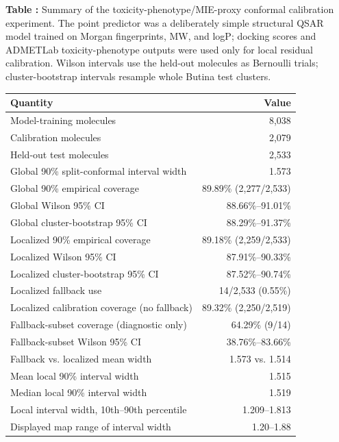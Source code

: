 \begin{center}
\label{tab:local_conformal}
\begin{minipage}{0.92\textwidth}
\textbf{Table \thetable:} Summary of the toxicity-phenotype/MIE-proxy conformal calibration experiment. The point predictor was a deliberately simple structural QSAR model trained on Morgan fingerprints, MW, and logP; docking scores and ADMETLab toxicity-phenotype outputs were used only for local residual calibration. Wilson intervals use the held-out molecules as Bernoulli trials; cluster-bootstrap intervals resample whole Butina test clusters.
\par\vspace{0.5em}
\centering
\begin{tabular}{lr}
\toprule
Quantity & Value \\
\midrule
Model-training molecules & 8,038 \\
Calibration molecules & 2,079 \\
Held-out test molecules & 2,533 \\
\midrule
Global 90\% split-conformal interval width & 1.573 \\
Global 90\% empirical coverage & 89.89\% (2,277/2,533) \\
Global Wilson 95\% CI & 88.66\%--91.01\% \\
Global cluster-bootstrap 95\% CI & 88.29\%--91.37\% \\
Localized 90\% empirical coverage & 89.18\% (2,259/2,533) \\
Localized Wilson 95\% CI & 87.91\%--90.33\% \\
Localized cluster-bootstrap 95\% CI & 87.52\%--90.74\% \\
Localized fallback use & 14/2,533 (0.55\%) \\
Localized calibration coverage (no fallback) & 89.32\% (2,250/2,519) \\
Fallback-subset coverage (diagnostic only) & 64.29\% (9/14) \\
Fallback-subset Wilson 95\% CI & 38.76\%--83.66\% \\
Fallback vs. localized mean width & 1.573 vs. 1.514 \\
Mean local 90\% interval width & 1.515 \\
Median local 90\% interval width & 1.519 \\
Local interval width, 10th--90th percentile & 1.209--1.813 \\
Displayed map range of interval width & 1.20--1.88 \\
\bottomrule
\end{tabular}
\end{minipage}
\end{center}
